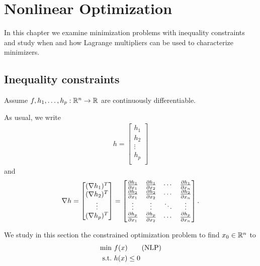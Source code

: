 \setchapterpreamble[u]{\margintoc}
\chapter{Nonlinear Optimization}

In this chapter we examine minimization problems with inequality constraints and study when and how Lagrange multipliers can be used to characterize minimizers.

\section{Inequality constraints}

Assume $f, h_1, \dots, h_p : \mathbb{R}^n \to \mathbb{R}$ are continuously differentiable.

As usual, we write
\begin{align}
h = \begin{bmatrix}
h_1 \\
h_2 \\
\vdots \\
h_p \\
\end{bmatrix}
\end{align}
and 
\begin{align}
\nabla h = \begin{bmatrix}
(\nabla h_1)^T \\
(\nabla h_2)^T \\
\vdots \\
(\nabla h_p)^T \\
\end{bmatrix}
= \begin{bmatrix}
\frac{\partial h_1}{\partial x_1} & \frac{\partial h_1}{\partial x_2} & \cdots & \frac{\partial h_1}{\partial x_n} \\
\frac{\partial h_2}{\partial x_1} & \frac{\partial h_2}{\partial x_2} & \cdots & \frac{\partial h_2}{\partial x_n} \\
\vdots & \vdots & \ddots & \vdots \\
\frac{\partial h_p}{\partial x_1} & \frac{\partial h_p}{\partial x_2} & \cdots & \frac{\partial h_p}{\partial x_n} \\
\end{bmatrix}.
\end{align}

We study in this section the constrained optimization problem to find $x_0 \in \mathbb{R}^n$ to 
\begin{align}
\min \ & f(x) \tag{NLP} \labeq{NLP} \\
\st & h(x) \le 0 \nonumber
\end{align}

